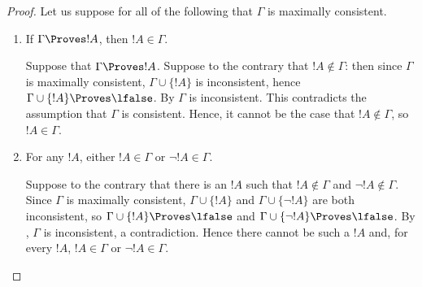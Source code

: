 \documentclass[../../include/open-logic-section]{subfiles}
\begin{document}
\begin{proof}
Let us suppose for all of the following that $\Gamma$ is maximally
consistent.
\begin{enumerate}
\item If $\Gamma \Proves !A$, then $!A \in \Gamma$.

Suppose that $\Gamma \Proves !A$. Suppose to the contrary that $!A
\notin \Gamma$: then since $\Gamma$ is maximally consistent, $\Gamma
\cup \{!A\}$ is inconsistent, hence $\Gamma \cup \{!A\} \Proves
\lfalse$.  By
$\Gamma$ is inconsistent. This contradicts the assumption that
$\Gamma$ is consistent. Hence, it cannot be the case that $!A \notin
\Gamma$, so $!A \in \Gamma$.

\item For any $!A$, either $!A \in \Gamma$ or $\lnot !A \in \Gamma$.

Suppose to the contrary that there is an $!A$ such that $!A \notin
\Gamma$ and $\lnot !A \notin \Gamma$. Since $\Gamma$ is maximally
consistent, $\Gamma \cup \{!A\}$ and $\Gamma \cup \{\lnot !A\}$ are
both inconsistent, so $\Gamma \cup \{!A\} \Proves \lfalse$ and $\Gamma
\cup \{\lnot !A\} \Proves \lfalse$. By
,
$\Gamma$ is inconsistent, a contradiction.  Hence there cannot be such
a $!A$ and, for every $!A$, $!A \in \Gamma$ or $\lnot !A \in \Gamma$.


\end{enumerate}
\end{proof}
\end{document}
